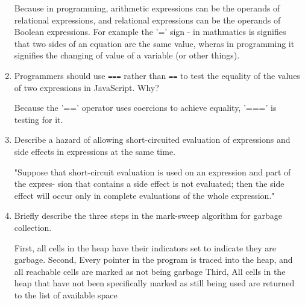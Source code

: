 \begin{enumerate}
  \begin{answer}

    Because in programming, arithmetic expressions can be the operands
    of relational expressions, and relational expressions can be the
    operands of Boolean expressions. For example the '=' sign - in
    mathmatics is signifies that two sides of an equation are the same
    value, wheras in programming it signifies the changing of value of
    a variable (or other things).

    \end{answer}

  \item Programmers should use \verb+===+ rather than \verb+==+ to
    test the equality of the values of two expressions in JavaScript. Why?

  \begin{answer}

    Because the '==' operator uses coercions to achieve equality,
    '===' is testing for it.

    \end{answer}

  \item Describe a hazard of allowing short-circuited evaluation
    of expressions and side effects in expressions at the same time.

  \begin{answer}

    "Suppose that short-circuit evaluation is used on an expression
    and part of the expres- sion that contains a side effect is not
    evaluated; then the side effect will occur only in complete
    evaluations of the whole expression."

    \end{answer}

  \item Briefly describe the three steps in the mark-sweep algorithm
    for garbage collection.

  \begin{answer}

    First, all cells in the heap have their indicators set to indicate
    they are garbage.  Second, Every pointer in the program is traced
    into the heap, and all reachable cells are marked as not being
    garbage Third, All cells in the heap that have not been
    specifically marked as still being used are returned to the list
    of available space
    \end{answer}


\end{enumerate}
